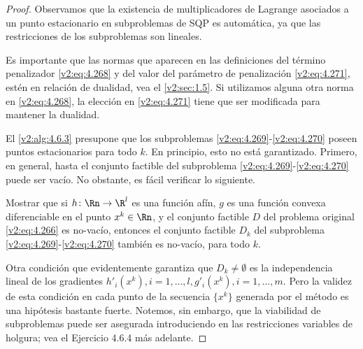 \begin{proof}
Observamos que la existencia de multiplicadores de Lagrange asociados a un punto estacionario en subproblemas de SQP es automática, ya que las restricciones de los subproblemas son lineales.

Es importante que las normas que aparecen en las definiciones del término penalizador \eqref{v2:eq:4.268} y del valor del parámetro de penalización \eqref{v2:eq:4.271}, estén en relación de dualidad, vea el \cref{v2:sec:1.5}. Si utilizamos alguna otra norma en \eqref{v2:eq:4.268}, la elección en \eqref{v2:eq:4.271} tiene que ser modificada para mantener la dualidad.

El \cref{v2:alg:4.6.3} presupone que los subproblemas \eqref{v2:eq:4.269}-\eqref{v2:eq:4.270} poseen puntos estacionarios para todo $k$. En principio, esto no está garantizado. Primero, en general, hasta el conjunto factible del subproblema \eqref{v2:eq:4.269}-\eqref{v2:eq:4.270} puede ser vacío. No obstante, es fácil verificar lo siguiente.

\begin{exercise}\label{v2:ex:4.6.3}
Mostrar que si $h \colon \Rn \to \R^l$ es una función afín, $g$ es una función convexa diferenciable en el punto $x^k \in \Rn$, y el conjunto factible $D$ del problema original \eqref{v2:eq:4.266} es no-vacío, entonces el conjunto factible $D_k$ del subproblema \eqref{v2:eq:4.269}-\eqref{v2:eq:4.270} también es no-vacío, para todo $k$.
\end{exercise}

Otra condición que evidentemente garantiza que $D_k \neq \emptyset$ es la independencia lineal de los gradientes $h'_i(x^k), i = 1, \dots, l, g'_i(x^k), i = 1, \dots, m$. Pero la validez de esta condición en cada punto de la secuencia $\{x^k\}$ generada por el método es una hipótesis bastante fuerte. Notemos, sin embargo, que la viabilidad de subproblemas puede ser asegurada introduciendo en las restricciones variables de holgura; vea el Ejercicio 4.6.4 más adelante.


\end{proof}
